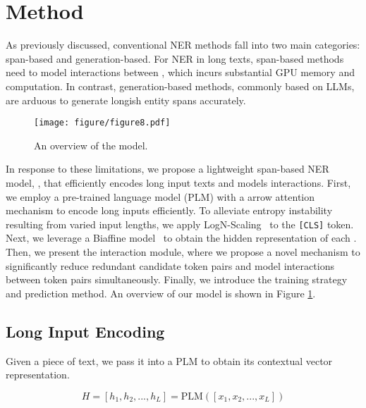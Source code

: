 \section{Method}

As previously discussed, conventional NER methods fall into two main categories: span-based and generation-based.
For NER in long texts, span-based methods need to model interactions between \tokenspans, which incurs substantial GPU memory and computation.
In contrast, generation-based methods, 
commonly based on LLMs, are arduous to generate longish entity spans accurately.

\begin{figure}[t]
\centering
\texttt{[image: figure/figure8.pdf]} %
\caption{An overview of the \model model.}
\label{fig:model}
\end{figure}

In response to these limitations, we propose a lightweight span-based NER model, \model, that efficiently encodes long input texts and models \tokenspans interactions.
First, we employ a pre-trained language model (PLM) with a arrow attention mechanism to encode long inputs efficiently. 
To alleviate entropy instability resulting from varied input lengths, we apply LogN-Scaling~\cite{su2021logn} to the \texttt{[CLS]} token.
Next, we leverage a Biaffine model~\cite{dozat2017deep} to obtain the hidden representation of each \tokenspan. %
Then, we present the \tokenspan interaction module,
where we propose a novel \biswa mechanism to significantly reduce redundant candidate token pairs
and model interactions between token pairs simultaneously.
Finally, we introduce the training strategy and prediction method.
An overview of our model is shown in Figure \ref{fig:model}.

\subsection{Long Input Encoding}
Given a piece of text, we pass it into a PLM to obtain its contextual vector representation.

\begin{equation}
H=\left [ h_{1}, h_{2}, ..., h_{L} \right ]=\text{PLM}\left ( \left [ x_{1}, x_{2}, ..., x_{L} \right ] \right )\label{eq1}
\end{equation}

